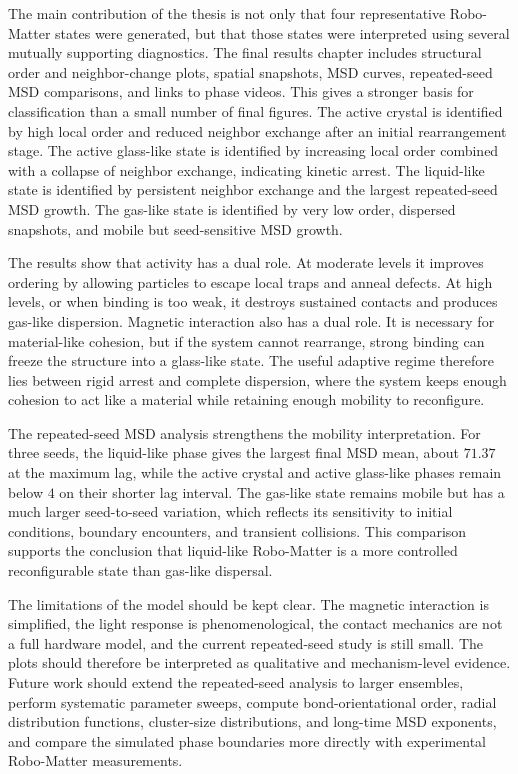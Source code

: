 \documentclass[12pt,a4paper,oneside]{report}
\begin{document}
The main contribution of the thesis is not only that four representative Robo-Matter states were generated, but that those states were interpreted using several mutually supporting diagnostics. The final results chapter includes structural order and neighbor-change plots, spatial snapshots, MSD curves, repeated-seed MSD comparisons, and links to phase videos. This gives a stronger basis for classification than a small number of final figures. The active crystal is identified by high local order and reduced neighbor exchange after an initial rearrangement stage. The active glass-like state is identified by increasing local order combined with a collapse of neighbor exchange, indicating kinetic arrest. The liquid-like state is identified by persistent neighbor exchange and the largest repeated-seed MSD growth. The gas-like state is identified by very low order, dispersed snapshots, and mobile but seed-sensitive MSD growth.

The results show that activity has a dual role. At moderate levels it improves ordering by allowing particles to escape local traps and anneal defects. At high levels, or when binding is too weak, it destroys sustained contacts and produces gas-like dispersion. Magnetic interaction also has a dual role. It is necessary for material-like cohesion, but if the system cannot rearrange, strong binding can freeze the structure into a glass-like state. The useful adaptive regime therefore lies between rigid arrest and complete dispersion, where the system keeps enough cohesion to act like a material while retaining enough mobility to reconfigure.

The repeated-seed MSD analysis strengthens the mobility interpretation. For three seeds, the liquid-like phase gives the largest final MSD mean, about $71.37$ at the maximum lag, while the active crystal and active glass-like phases remain below $4$ on their shorter lag interval. The gas-like state remains mobile but has a much larger seed-to-seed variation, which reflects its sensitivity to initial conditions, boundary encounters, and transient collisions. This comparison supports the conclusion that liquid-like Robo-Matter is a more controlled reconfigurable state than gas-like dispersal.

The limitations of the model should be kept clear. The magnetic interaction is simplified, the light response is phenomenological, the contact mechanics are not a full hardware model, and the current repeated-seed study is still small. The plots should therefore be interpreted as qualitative and mechanism-level evidence. Future work should extend the repeated-seed analysis to larger ensembles, perform systematic parameter sweeps, compute bond-orientational order, radial distribution functions, cluster-size distributions, and long-time MSD exponents, and compare the simulated phase boundaries more directly with experimental Robo-Matter measurements.
\end{document}
